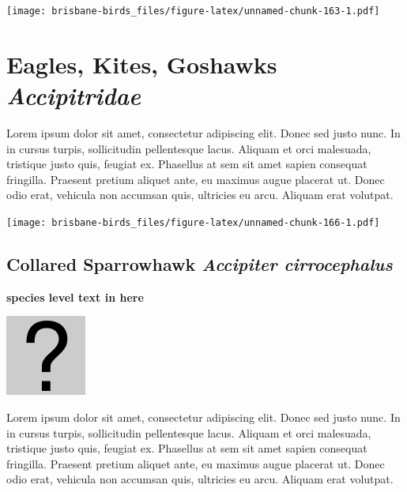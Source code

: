 \documentclass[]{book}
\let\origfigure\figure
\let\endorigfigure\endfigure
\renewenvironment{figure}[1][2] {
  \expandafter\origfigure\expandafter[H]
} {
  \endorigfigure
}
\begin{document}
\begin{figure}
\centering
\texttt{[image: brisbane-birds\_files/figure-latex/unnamed-chunk-163-1.pdf]}
\caption{\label{fig:unnamed-chunk-163}insert figure caption}
\end{figure}

\chapter{\texorpdfstring{Eagles, Kites, Goshawks
\emph{Accipitridae}}{Eagles, Kites, Goshawks Accipitridae}}\label{eagles-kites-goshawks-accipitridae}

Lorem ipsum dolor sit amet, consectetur adipiscing elit. Donec sed justo
nunc. In in cursus turpis, sollicitudin pellentesque lacus. Aliquam et
orci malesuada, tristique justo quis, feugiat ex. Phasellus at sem sit
amet sapien consequat fringilla. Praesent pretium aliquet ante, eu
maximus augue placerat ut. Donec odio erat, vehicula non accumsan quis,
ultricies eu arcu. Aliquam erat volutpat.

\texttt{[image: brisbane-birds\_files/figure-latex/unnamed-chunk-166-1.pdf]}

\section{\texorpdfstring{Collared Sparrowhawk \emph{Accipiter
cirrocephalus}}{Collared Sparrowhawk Accipiter cirrocephalus}}\label{collared-sparrowhawk-accipiter-cirrocephalus}

\textbf{species level text in here}

\begin{figure}
\centering
\includegraphics{assets/missing.png}
\caption{No image for species}
\end{figure}

Lorem ipsum dolor sit amet, consectetur adipiscing elit. Donec sed justo
nunc. In in cursus turpis, sollicitudin pellentesque lacus. Aliquam et
orci malesuada, tristique justo quis, feugiat ex. Phasellus at sem sit
amet sapien consequat fringilla. Praesent pretium aliquet ante, eu
maximus augue placerat ut. Donec odio erat, vehicula non accumsan quis,
ultricies eu arcu. Aliquam erat volutpat.
\end{document}
